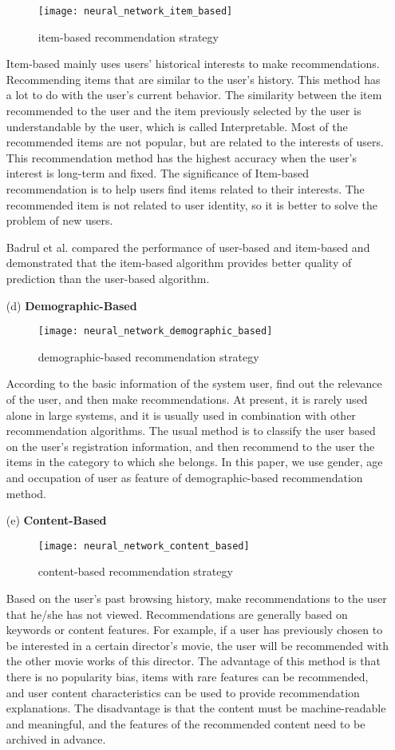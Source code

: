 \begin{itemize}
\begin{figure}[h]
\caption{item-based recommendation strategy}
\centering
\texttt{[image: neural\_network\_item\_based]}
\end{figure}
Item-based mainly uses users' historical interests to make recommendations. Recommending items that are similar to the user's history. This method has a lot to do with the user's current behavior. The similarity between the item recommended to the user and the item previously selected by the user is understandable by the user, which is called Interpretable. Most of the recommended items are not popular, but are related to the interests of users. This recommendation method has the highest accuracy when the user's interest is long-term and fixed. The significance of Item-based recommendation is to help users find items related to their interests. The recommended item is not related to user identity, so it is better to solve the problem of new users.
\par Badrul et al.\cite{sarwar2001item} compared the performance of user-based and item-based and demonstrated that the item-based algorithm provides better quality of prediction than the user-based algorithm.
\item[(d)]\textbf{Demographic-Based}\\
\begin{figure}[h]
\caption{demographic-based recommendation strategy}
\centering
\texttt{[image: neural\_network\_demographic\_based]}
\end{figure}
According to the basic information of the system user, find out the relevance of the user, and then make recommendations. At present, it is rarely used alone in large systems, and it is usually used in combination with other recommendation algorithms. The usual method is to classify the user based on the user's registration information, and then recommend to the user the items in the category to which she belongs. In this paper, we use gender, age and occupation of user as feature of demographic-based recommendation method.
\item[(e)]\textbf{Content-Based}\\
\begin{figure}[h]
\caption{content-based recommendation strategy}
\centering
\texttt{[image: neural\_network\_content\_based]}
\end{figure}
Based on the user's past browsing history, make recommendations to the user that he/she has not viewed. Recommendations are generally based on keywords or content features. For example, if a user has previously chosen to be interested in a certain director's movie, the user will be recommended with the other movie works of this director. The advantage of this method is that there is no popularity bias, items with rare features can be recommended, and user content characteristics can be used to provide recommendation explanations. The disadvantage is that the content must be machine-readable and meaningful, and the features of the recommended content need to be archived in advance.

\end{itemize}
